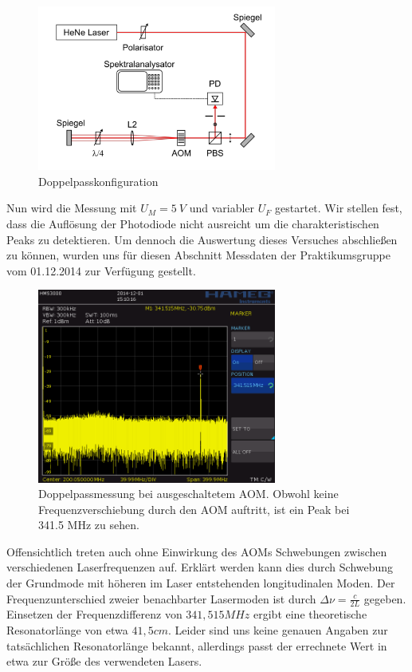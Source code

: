 \documentclass[bigchapter,colorback,accentcolor=tud4b,linedtoc,11pt]{tudreport}
\begin{document}
\begin{figure}[H] 
  \centering
     \includegraphics[width=0.7\textwidth]{img/doppelpass.jpg}
  \caption[Cap for listoffigures]{Doppelpasskonfiguration \cite{Anleitung}}
  \label{fig:Bild3}
\end{figure}

Nun wird die Messung mit $U_M = 5~V$ und variabler $U_F$ gestartet. Wir stellen fest, dass die Auflösung der Photodiode nicht ausreicht um die charakteristischen Peaks zu detektieren. Um dennoch die Auswertung dieses Versuches abschließen zu können, wurden uns für diesen Abschnitt Messdaten der Praktikumsgruppe vom 01.12.2014 zur Verfügung gestellt.

\begin{figure}[H]
  \centering
     \includegraphics[width=0.7\textwidth]{data/Aufgabe6/aom_aus.png}
  \caption[Cap for listoffigures]{Doppelpassmessung bei ausgeschaltetem AOM. Obwohl keine Frequenzverschiebung durch den AOM auftritt, ist ein Peak bei 341.5 MHz zu sehen.\cite{AndereGruppe}}
  \label{fig:Bild4}
\end{figure}

Offensichtlich treten auch ohne Einwirkung des AOMs Schwebungen zwischen verschiedenen Laserfrequenzen auf. Erklärt werden kann dies durch Schwebung der Grundmode mit höheren im Laser entstehenden longitudinalen Moden. Der Frequenzunterschied zweier benachbarter Lasermoden ist durch $\Delta \nu = \frac{c}{2L}$ gegeben. Einsetzen der Frequenzdifferenz von $341,515 MHz$ ergibt eine theoretische Resonatorlänge von etwa $41,5 cm$. Leider sind uns keine genauen Angaben zur tatsächlichen Resonatorlänge bekannt, allerdings passt der errechnete Wert in etwa zur Größe des verwendeten Lasers.
\end{document}

